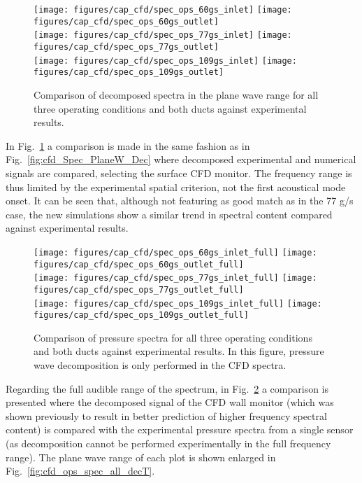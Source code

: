 \begin{figure}[htb!]
\centering
\texttt{[image: figures/cap\_cfd/spec\_ops\_60gs\_inlet]}
\texttt{[image: figures/cap\_cfd/spec\_ops\_60gs\_outlet]}\\[4mm]
\texttt{[image: figures/cap\_cfd/spec\_ops\_77gs\_inlet]}
\texttt{[image: figures/cap\_cfd/spec\_ops\_77gs\_outlet]}\\[4mm]
\texttt{[image: figures/cap\_cfd/spec\_ops\_109gs\_inlet]}
\texttt{[image: figures/cap\_cfd/spec\_ops\_109gs\_outlet]}
\caption[Comparison of spectra for three conditions (plane wave)]{Comparison of decomposed spectra in the plane wave range for all three operating conditions and both ducts against experimental results.}
\label{fig:cfd_ops_spec_all_PW}
\end{figure}

In Fig.~\ref{fig:cfd_ops_spec_all_PW} a comparison is made in the same fashion as in Fig.~\ref{fig:cfd_Spec_PlaneW_Dec} where decomposed experimental and numerical signals are compared, selecting the surface CFD monitor. The frequency range is thus limited by the experimental spatial criterion, not the first acoustical mode onset. It can be seen that, although not featuring as good match as in the 77 g/s case, the new simulations show a similar trend in spectral content compared against experimental results. 

\begin{figure}[htb!]
\centering
\texttt{[image: figures/cap\_cfd/spec\_ops\_60gs\_inlet\_full]}
\texttt{[image: figures/cap\_cfd/spec\_ops\_60gs\_outlet\_full]}\\[4mm]
\texttt{[image: figures/cap\_cfd/spec\_ops\_77gs\_inlet\_full]}
\texttt{[image: figures/cap\_cfd/spec\_ops\_77gs\_outlet\_full]}\\[4mm]
\texttt{[image: figures/cap\_cfd/spec\_ops\_109gs\_inlet\_full]}
\texttt{[image: figures/cap\_cfd/spec\_ops\_109gs\_outlet\_full]}
\caption[Comparison of spectra for three conditions (full range)]{Comparison of pressure spectra for all three operating conditions and both ducts against experimental results. In this figure, pressure wave decomposition is only performed in the CFD spectra.}
\label{fig:cfd_ops_spec_all_full}
\end{figure}

Regarding the full audible range of the spectrum, in Fig.~\ref{fig:cfd_ops_spec_all_full} a comparison is presented where the decomposed signal of the CFD wall monitor (which was shown previously to result in better prediction of higher frequency spectral content) is compared with the experimental pressure spectra from a single sensor (as decomposition cannot be performed experimentally in the full frequency range). The plane wave range of each plot is shown enlarged in Fig.~\ref{fig:cfd_ops_spec_all_decT}.

